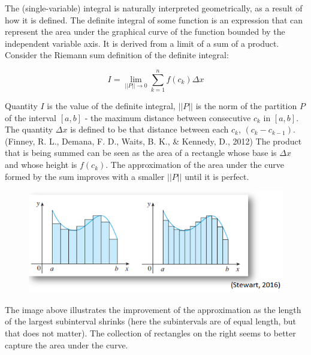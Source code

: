 \documentclass[11pt]{article}
\begin{document}

The (single-variable) integral is naturally interpreted geometrically, as a result of how it is defined. The definite integral of some function is an expression that can represent the area under the graphical curve of the function bounded by the independent variable axis. It is derived from a limit of a sum of a product. Consider the Riemann sum definition of the definite integral:

$$I = \lim_{||P||\to{0}}\sum_{k=1}^n{f(c_k)\Delta{x}}$$

Quantity $I$ is the value of the definite integral, $||P||$ is the norm of the partition $P$ of the interval $[a,b]$ - the maximum distance between consecutive $c_k$ in $[a,b]$. The quantity $\Delta{x}$ is defined to be that distance between each $c_k$, $(c_k-c_{k-1})$. (Finney, R. L., Demana, F. D., Waits, B. K., \& Kennedy, D., 2012) The product that is being summed can be seen as the area of a rectangle whose base is $\Delta{x}$ and whose height is $f(c_k)$. The approximation of the area under the curve formed by the sum improves with a smaller $||P||$ until it is perfect.

\begin{figure}[h]
\centering
\includegraphics[scale=0.75]{approx}
\end{figure}

The image above illustrates the improvement of the approximation as the length of the largest subinterval shrinks (here the subintervals are of equal length, but that does not matter). The collection of rectangles on the right seems to better capture the area under the curve.
\end{document}
